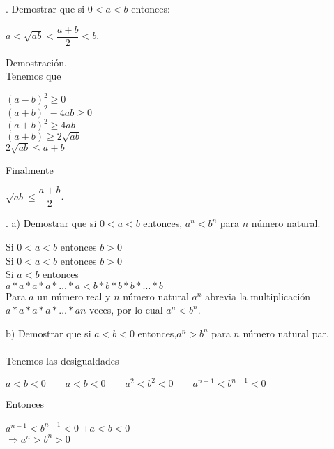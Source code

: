 \documentclass[12pt,a4paper,scrartcl]{article}
\begin{document}
{. Demostrar que si $0 < a < b$ entonces:\\
\begin{center}
$a < \sqrt{ab} < \dfrac{a+b}{2} < b.$
\end{center}
Demostraci\'on.\\
Tenemos que\\
\begin{center}
$(a-b)^2 \geq 0$\\\vspace{1em}
$(a+b)^2 - 4 ab \geq 0$\\\vspace{1em}
$(a+b)^2 \geq 4ab$\\\vspace{1em}
$(a+b)\geq2\sqrt{ab}$\\\vspace{1em}
$2\sqrt{ab}\leq a+b$\\\vspace{1em}
\end{center}
Finalmente 
\begin{center}
$\sqrt{ab}\leq \dfrac{a+b}{2}$.
\end{center}

. a) Demostrar que si $0<a<b$ entonces, $a^n<b^n$ para $n$ n\'umero natural.
\begin{center}
Si $0<a<b$ entonces $b>0$\\
Si $0<a<b$ entonces $b>0$\\
Si $a<b$ entonces\\ $a*a*a*a*\ldots*a<b*b*b*b*\ldots*b$\\
Para $a$ un n\'umero real y $n$ n\'umero natural $a^n$
abrevia la multiplicaci\'on\\ $a*a*a*a*\ldots*an$ veces, por lo cual $a^n<b^n$.
\end{center}\vspace{4em}


b) Demostrar que si $a<b<0$ entonces,$a^n>b^n$ para $n$ n\'umero natural par.\\
\\Tenemos las desigualdades \\
\begin{center}
$a<b<0\hspace{2em}a<b<0\hspace{2em}a^2<b^2<0\hspace{2em}a^{n-1}<b^{n-1}<0$
\end{center}
Entonces\\
\begin{center}
$a^{n-1}<b^{n-1}<0$
+$ a < b < 0 $\\
$\Rightarrow a^n>b^n>0$
\end{center}

}
\end{document}
